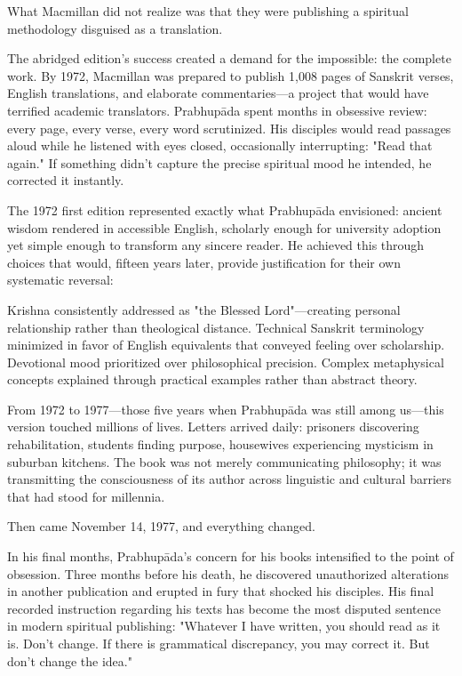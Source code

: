 \documentclass[11pt,twoside]{book}
\begin{document}
What Macmillan did not realize was that they were publishing a spiritual methodology disguised as a translation.

The abridged edition's success created a demand for the impossible: the complete work. By 1972, Macmillan was prepared to publish 1,008 pages of Sanskrit verses, English translations, and elaborate commentaries—a project that would have terrified academic translators. Prabhupāda spent months in obsessive review: every page, every verse, every word scrutinized. His disciples would read passages aloud while he listened with eyes closed, occasionally interrupting: "Read that again." If something didn't capture the precise spiritual mood he intended, he corrected it instantly.

The 1972 first edition represented exactly what Prabhupāda envisioned: ancient wisdom rendered in accessible English, scholarly enough for university adoption yet simple enough to transform any sincere reader. He achieved this through choices that would, fifteen years later, provide justification for their own systematic reversal:

Krishna consistently addressed as "the Blessed Lord"—creating personal relationship rather than theological distance. Technical Sanskrit terminology minimized in favor of English equivalents that conveyed feeling over scholarship. Devotional mood prioritized over philosophical precision. Complex metaphysical concepts explained through practical examples rather than abstract theory.

From 1972 to 1977—those five years when Prabhupāda was still among us—this version touched millions of lives. Letters arrived daily: prisoners discovering rehabilitation, students finding purpose, housewives experiencing mysticism in suburban kitchens. The book was not merely communicating philosophy; it was transmitting the consciousness of its author across linguistic and cultural barriers that had stood for millennia.

Then came November 14, 1977, and everything changed.

In his final months, Prabhupāda's concern for his books intensified to the point of obsession. Three months before his death, he discovered unauthorized alterations in another publication and erupted in fury that shocked his disciples. His final recorded instruction regarding his texts has become the most disputed sentence in modern spiritual publishing: "Whatever I have written, you should read as it is. Don't change. If there is grammatical discrepancy, you may correct it. But don't change the idea."
\end{document}
